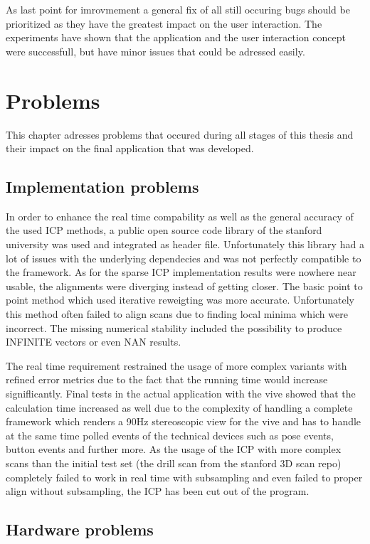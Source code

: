 \documentclass[hyperref,english,bachelorofscience,bibnum]{cgvpub}
\begin{document}
As last point for imrovmement a general fix of all still occuring bugs should be prioritized as they have the greatest impact on the user interaction.
The experiments have shown that the application and the user interaction concept were successfull, but have minor issues that could be adressed easily.

\chapter{Problems}

This chapter adresses problems that occured during all stages of this thesis and their impact on the final application that was developed.

\section{Implementation problems}

In order to enhance the real time compability as well as the general accuracy of the used ICP methods, a public open source code library of the stanford university was used and integrated as header file. Unfortunately this library had a lot of issues with the underlying dependecies and was not perfectly compatible to the framework. As for the sparse ICP implementation results were nowhere near usable, the alignments were diverging instead of getting closer. The basic point to point method which used iterative reweigting
was more accurate. Unfortunately this method often failed to align scans due to finding local minima which were incorrect. The missing numerical stability included the possibility to produce INFINITE vectors or even NAN results.

The real time requirement restrained the usage of more complex variants with refined error metrics due to the fact that the running time would increase signiflicantly. Final tests in the actual application with the vive showed that the calculation time increased as well due to the complexity of handling a complete framework which renders a 90Hz stereoscopic view for the vive and has to handle at the same time polled events of the technical devices such as pose events, button events and further more. As the usage of the ICP with more complex scans than the initial test set (the drill scan from the stanford 3D scan repo) completely failed to work in real time with subsampling and even failed to proper align without subsampling, the ICP has been cut out of the program.

\section{Hardware problems}
\end{document}
